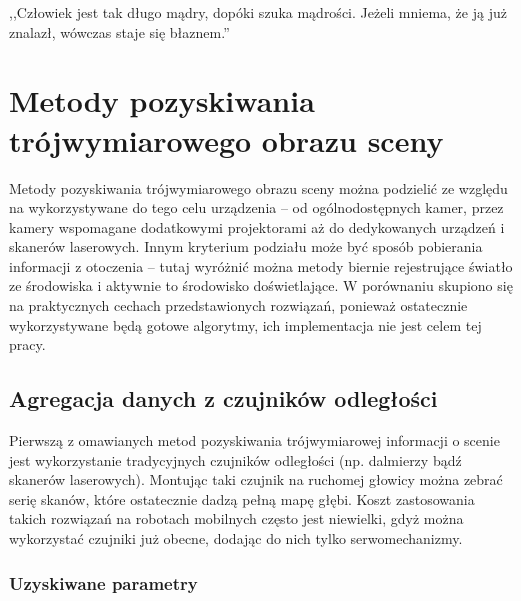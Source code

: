 

\begin{savequote}[70mm]
,,Człowiek jest tak długo mądry, dopóki szuka mądrości. Jeżeli mniema, że ją już
znalazł, wówczas staje się błaznem.''
\end{savequote}

\chapter{Metody pozyskiwania trójwymiarowego obrazu sceny}
\label{chap:porownanie}


Metody pozyskiwania trójwymiarowego obrazu sceny można podzielić ze względu
na wykorzystywane do tego celu urządzenia -- od ogólnodostępnych kamer, przez
kamery wspomagane dodatkowymi projektorami aż do dedykowanych urządzeń i
skanerów laserowych. Innym kryterium podziału może być sposób pobierania
informacji z otoczenia -- tutaj wyróżnić można metody biernie rejestrujące
światło ze środowiska i aktywnie to środowisko doświetlające. W porównaniu
skupiono się na praktycznych cechach przedstawionych rozwiązań, ponieważ
ostatecznie wykorzystywane będą gotowe algorytmy, ich implementacja nie jest
celem tej pracy.

\section{Agregacja danych z czujników odległości}

Pierwszą z omawianych metod pozyskiwania trójwymiarowej informacji o scenie jest
wykorzystanie tradycyjnych czujników odległości (np. dalmierzy bądź skanerów
laserowych). Montując taki czujnik na ruchomej głowicy można zebrać serię
skanów, które ostatecznie dadzą pełną mapę głębi. Koszt zastosowania takich
rozwiązań na robotach mobilnych często jest niewielki, gdyż można wykorzystać
czujniki już obecne, dodając do nich tylko serwomechanizmy. 

\subsection{Uzyskiwane parametry}

